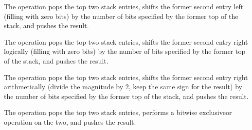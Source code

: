 \begin{enumerate}[1. ]
\itembfnl{\DWOPshlTARG}
The \DWOPshlNAME{} operation pops the top two stack entries,
shifts the former second entry left (filling with zero bits)
by the number of bits specified by the former top of the stack,
and pushes the result.

\itembfnl{\DWOPshrTARG}
The \DWOPshrNAME{} operation pops the top two stack entries,
shifts the former second entry right logically (filling with
zero bits) by the number of bits specified by the former top
of the stack, and pushes the result.

\itembfnl{\DWOPshraTARG}
The \DWOPshraNAME{} operation pops the top two stack entries,
shifts the former second entry right arithmetically (divide
the magnitude by 2, keep the same sign for the result) by
the number of bits specified by the former top of the stack,
and pushes the result.

\itembfnl{\DWOPxorTARG}
The \DWOPxorNAME{} operation pops the top two stack entries,
performs a bitwise exclusive\dash or operation on the two, and
pushes the result.

\end{enumerate}

